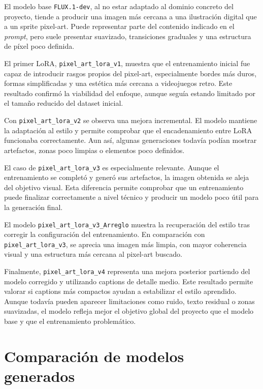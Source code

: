 \documentclass[a4paper,11pt,titlepage]{scrbook}
\begin{document}
El modelo base \texttt{FLUX.1-dev}, al no estar adaptado al dominio concreto del proyecto, tiende a producir una imagen más cercana a una ilustración digital que a un sprite pixel-art. Puede representar parte del contenido indicado en el \textit{prompt}, pero suele presentar suavizado, transiciones graduales y una estructura de píxel poco definida.

\medskip

El primer LoRA, \texttt{pixel\_art\_lora\_v1}, muestra que el entrenamiento inicial fue capaz de introducir rasgos propios del pixel-art, especialmente bordes más duros, formas simplificadas y una estética más cercana a videojuegos retro. Este resultado confirmó la viabilidad del enfoque, aunque seguía estando limitado por el tamaño reducido del dataset inicial.

\medskip

Con \texttt{pixel\_art\_lora\_v2} se observa una mejora incremental. El modelo mantiene la adaptación al estilo y permite comprobar que el encadenamiento entre LoRA funcionaba correctamente. Aun así, algunas generaciones todavía podían mostrar artefactos, zonas poco limpias o elementos poco definidos.

\medskip

El caso de \texttt{pixel\_art\_lora\_v3} es especialmente relevante. Aunque el entrenamiento se completó y generó sus artefactos, la imagen obtenida se aleja del objetivo visual. Esta diferencia permite comprobar que un entrenamiento puede finalizar correctamente a nivel técnico y producir un modelo poco útil para la generación final.

\medskip

El modelo \texttt{pixel\_art\_lora\_v3\_Arreglo} muestra la recuperación del estilo tras corregir la configuración del entrenamiento. En comparación con \texttt{pixel\_art\_lora\_v3}, se aprecia una imagen más limpia, con mayor coherencia visual y una estructura más cercana al pixel-art buscado.

\medskip

Finalmente, \texttt{pixel\_art\_lora\_v4} representa una mejora posterior partiendo del modelo corregido y utilizando captions de detalle medio. Este resultado permite valorar si captions más compactos ayudan a estabilizar el estilo aprendido. Aunque todavía pueden aparecer limitaciones como ruido, texto residual o zonas suavizadas, el modelo refleja mejor el objetivo global del proyecto que el modelo base y que el entrenamiento problemático.
\section{Comparación de modelos generados}
\end{document}
